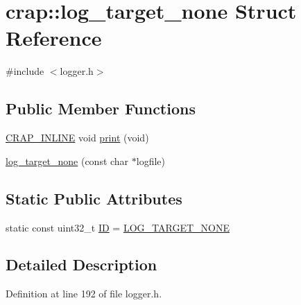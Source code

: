 \hypertarget{structcrap_1_1log__target__none}{\section{crap\+:\+:log\+\_\+target\+\_\+none Struct Reference}
\label{structcrap_1_1log__target__none}
}


{\ttfamily \#include $<$logger.\+h$>$}

\subsection*{Public Member Functions}
\begin{DoxyCompactItemize}
\item 
\hyperlink{config__x86_8h_a5a40526b8d842e7ff731509998bb0f1c}{C\+R\+A\+P\+\_\+\+I\+N\+L\+I\+N\+E} void \hyperlink{structcrap_1_1log__target__none_a70b3621a5eddfc8383c4f074bc0901dc}{print} (void)
\item 
\hyperlink{structcrap_1_1log__target__none_a984b631178aafb194e76aa15a322d27e}{log\+\_\+target\+\_\+none} (const char $\ast$logfile)
\end{DoxyCompactItemize}
\subsection*{Static Public Attributes}
\begin{DoxyCompactItemize}
\item 
static const uint32\+\_\+t \hyperlink{structcrap_1_1log__target__none_a18e17216de74467e62adc28d1a86c941}{I\+D} = \hyperlink{logger_8h_a9235b8d7801877c99589aab3edcf05fd}{L\+O\+G\+\_\+\+T\+A\+R\+G\+E\+T\+\_\+\+N\+O\+N\+E}
\end{DoxyCompactItemize}


\subsection{Detailed Description}


Definition at line 192 of file logger.\+h.



